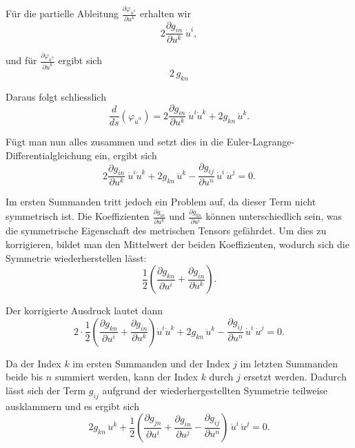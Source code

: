 Für die partielle Ableitung $\frac{\partial \varphi_{\dot{u}^n}}{\partial u^k}$ erhalten wir
\begin{equation}
	2 \frac{\partial g_{in}}{\partial u^k} \ \dot{u}^i,
\end{equation}

und für $\frac{\partial \varphi_{\dot{u}^n}}{\partial \dot{u}^k}$ ergibt sich
\begin{equation}
	2 \, g_{kn}
\end{equation}

Daraus folgt schliesslich
\begin{equation}
	\frac{d}{ds} \left( \varphi_{\dot{u}^n} \right) = 2 \frac{\partial g_{in}}{\partial u^k} \ \dot{u}^i \dot{u}^k + 2 g_{kn} \, \ddot{u}^k.
\end{equation}

Fügt man nun alles zusammen und setzt dies in die Euler-Lagrange-Differentialgleichung ein, ergibt sich
\begin{equation}
	2 \frac{\partial g_{in}}{\partial u^k} \ \dot{u}^i \dot{u}^k + 2 g_{kn} \, \ddot{u}^k - \frac{\partial g_{ij}}{\partial u^n} \, \dot{u}^i \, \dot{u}^j = 0.
\end{equation}

Im ersten Summanden tritt jedoch ein Problem auf, da dieser Term nicht symmetrisch ist. 
Die Koeffizienten $\frac{\partial g_{in}}{\partial u^k}$ und $\frac{\partial g_{kn}}{\partial u^i}$ können unterschiedlich sein, was die symmetrische Eigenschaft des metrischen Tensors gefährdet. 
Um dies zu korrigieren, bildet man den Mittelwert der beiden Koeffizienten, wodurch sich die Symmetrie wiederherstellen lässt:
\begin{equation}
	\frac{1}{2} \left( \frac{\partial g_{kn}}{\partial u^i} + \frac{\partial g_{in}}{\partial u^k} \right).
\end{equation}

Der korrigierte Ausdruck lautet dann
\begin{equation}
	2 \cdot \frac{1}{2} \left( \frac{\partial g_{kn}}{\partial u^i} + \frac{\partial g_{in}}{\partial u^k} \right) \dot{u}^i \dot{u}^k + 2 g_{kn} \, \ddot{u}^k - \frac{\partial g_{ij}}{\partial u^n} \, \dot{u}^i \, \dot{u}^j = 0.
\end{equation}

Da der Index $k$ im ersten Summanden und der Index $j$ im letzten Summanden beide bis $n$ summiert werden, kann der Index $k$ durch $j$ ersetzt werden. 
Dadurch lässt sich der Term $g_{ij}$ aufgrund der wiederhergestellten Symmetrie teilweise ausklammern und es ergibt sich
\begin{equation}
	2 g_{kn} \, \ddot{u}^k + \frac{1}{2} \left( \frac{\partial g_{jn}}{\partial u^i} + \frac{\partial g_{in}}{\partial u^j} - \frac{\partial g_{ij}}{\partial u^n} \right) \, \dot{u}^i \, \dot{u}^j = 0.
\end{equation}

